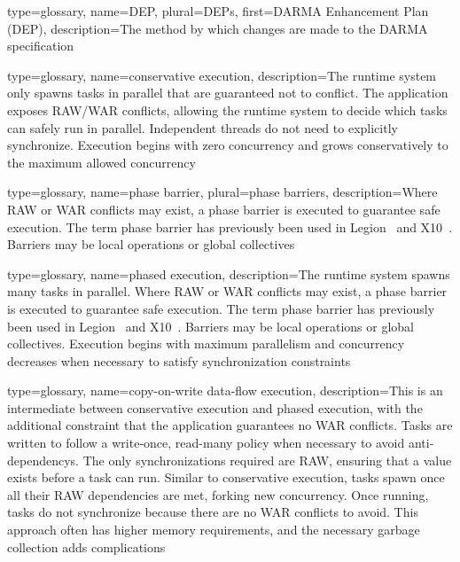 {
  type=glossary,
  name={DEP},
  plural={DEPs},
  first={\gls{DARMA} Enhancement Plan (DEP)},
  description={The method by which changes are made to the \gls{DARMA}
    specification}
}


{
  type=glossary,
  name={conservative execution},
  description={The \gls{runtime system} only spawns tasks in parallel that are guaranteed not to conflict.  
The application exposes \gls{RAW}/\gls{WAR} conflicts, allowing the
  \gls{runtime system} to decide which tasks can safely 
run in parallel.  Independent threads do not need to explicitly synchronize.
Execution begins with zero \gls{concurrency}
and grows conservatively to the maximum allowed \gls{concurrency}}
}

{
  type=glossary,
  name={phase barrier},
  plural={phase barriers},
  description={Where
    \gls{RAW} or \gls{WAR} conflicts may 
  exist, a \gls{phase barrier} is executed to guarantee safe execution. The
  term \gls{phase barrier} has previously 
  been used in Legion~\cite{LegionThesis} and X10~\cite{X10Phasers}. Barriers may be local operations 
  or global collectives }
}


{
  type=glossary,
  name={phased execution},
  description={The \gls{runtime system} spawns many tasks in parallel.  Where
    \gls{RAW} or \gls{WAR} conflicts may 
  exist, a \gls{phase barrier} is executed to guarantee safe execution. The
  term \gls{phase barrier} has previously 
  been used in Legion~\cite{LegionThesis} and X10~\cite{X10Phasers}. Barriers may be local operations 
  or global collectives.  Execution begins with maximum parallelism and
  \gls{concurrency} decreases when 
  necessary to satisfy synchronization constraints}
}

{
  type=glossary,
  name={copy-on-write data-flow execution},
  description={This is an intermediate between \gls{conservative execution} and
    \gls{phased execution}, with the additional constraint that the application guarantees no 
    \gls{WAR} conflicts.  Tasks are written to follow a
    write-once, read-many policy when necessary to avoid \glspl{anti-dependency}.
    The only synchronizations required are \gls{RAW}, ensuring that a
    value exists before a task can run.  Similar to \gls{conservative
      execution},
    tasks spawn once all their \gls{RAW} dependencies are met, forking new
      \gls{concurrency}.  
    Once running, tasks do not synchronize because there are no \gls{WAR} conflicts
    to avoid.  This approach often has higher memory requirements, and the
    necessary \gls{garbage collection} adds complications}
}

